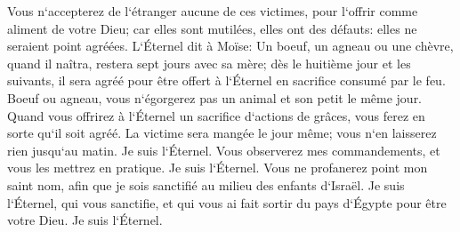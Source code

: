 \verse Vous n`accepterez de l`étranger aucune de ces victimes, pour l`offrir comme aliment de votre Dieu; car elles sont mutilées, elles ont des défauts: elles ne seraient point agréées. 
\verse L`Éternel dit à Moïse: 
\verse Un boeuf, un agneau ou une chèvre, quand il naîtra, restera sept jours avec sa mère; dès le huitième jour et les suivants, il sera agréé pour être offert à l`Éternel en sacrifice consumé par le feu. 
\verse Boeuf ou agneau, vous n`égorgerez pas un animal et son petit le même jour. 
\verse Quand vous offrirez à l`Éternel un sacrifice d`actions de grâces, vous ferez en sorte qu`il soit agréé. 
\verse La victime sera mangée le jour même; vous n`en laisserez rien jusqu`au matin. Je suis l`Éternel. 
\verse Vous observerez mes commandements, et vous les mettrez en pratique. Je suis l`Éternel. 
\verse Vous ne profanerez point mon saint nom, afin que je sois sanctifié au milieu des enfants d`Israël. Je suis l`Éternel, qui vous sanctifie, 
\verse et qui vous ai fait sortir du pays d`Égypte pour être votre Dieu. Je suis l`Éternel. 


